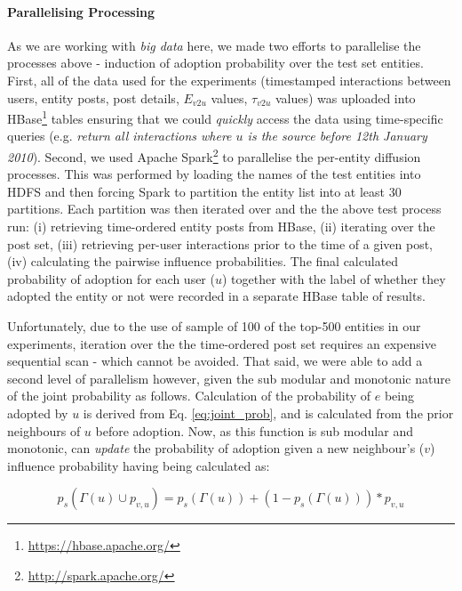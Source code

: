 \documentclass[journal,10pt,draftclsnofoot,onecolumn]{IEEEtran}
\begin{document}
\paragraph{Parallelising Processing}
As we are working with \emph{big data} here, we made two efforts to parallelise the processes above - induction of adoption probability over the test set entities.
First, all of the data used for the experiments (timestamped interactions between users, entity posts, post details, $E_{v2u}$ values, $\tau_{v2u}$ values) was uploaded into HBase\footnote{\url{https://hbase.apache.org/}} tables ensuring that we could \emph{quickly} access the data using time-specific queries (e.g. \emph{return all interactions where $u$ is the source before 12th January 2010}).
Second, we used Apache Spark\footnote{\url{http://spark.apache.org/}} to parallelise the per-entity diffusion processes.
This was performed by loading the names of the test entities into HDFS and then forcing Spark to partition the entity list into at least 30 partitions.
Each partition was then iterated over and the the above test process run: (i) retrieving time-ordered entity posts from HBase, (ii) iterating over the post set, (iii) retrieving per-user interactions prior to the time of a given post, (iv) calculating the pairwise influence probabilities.
The final calculated probability of adoption for each user ($u$) together with the label of whether they adopted the entity or not were recorded in a separate HBase table of results.

Unfortunately, due to the use of sample of 100 of the top-500 entities in our experiments, iteration over the the time-ordered post set requires an expensive sequential scan - which cannot be avoided.
That said, we were able to add a second level of parallelism however, given the sub modular and monotonic nature of the joint probability as follows.
Calculation of the probability of $e$ being adopted by $u$ is derived from Eq. \ref{eq:joint_prob}, and is calculated from the prior neighbours of $u$ before adoption.
Now, as this function is sub modular and monotonic, can \emph{update} the probability of adoption given a new neighbour's ($v$) influence probability having being calculated as:

\begin{equation}
p_s(\Gamma(u) \cup p_{v,u}) = p_s(\Gamma(u)) + (1 - p_s(\Gamma(u))) * p_{v,u}
\end{equation}
\end{document}
